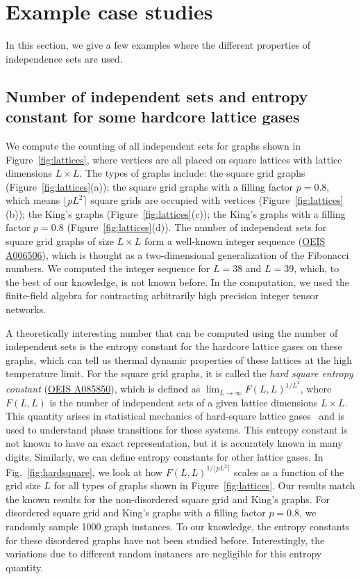 \documentclass[onefignum, onetabnum]{siamart190516}
\newcommand{\<}{\langle}
\renewcommand{\>}{\rangle}
\newcommand{\Fig}[1]{Fig.~\ref{#1}}
\newcounter{example}
\begin{document}
\section{Example case studies} \label{sec:examples}
In this section, we give a few examples where the different properties of independence sets are used.

\subsection{Number of independent sets and entropy constant for some hardcore lattice gases}\label{sec:entropy}
We compute the counting of all independent sets for graphs shown in Figure~\ref{fig:lattices}, where vertices are all placed on square lattices with lattice dimensions $L \times L$.
The types of graphs include: the square grid graphs (Figure~\ref{fig:lattices}(a)); the square grid graphs with a filling factor $p=0.8$, which means $\lfloor pL^{2} \rceil$ square grids are occupied with vertices  (Figure~\ref{fig:lattices}(b));
the King's graphs  (Figure~\ref{fig:lattices}(c)); the King's graphs with a filling factor $p = 0.8$  (Figure~\ref{fig:lattices}(d)).
The number of independent sets for square grid graphs of size $L \times L$ form a well-known integer sequence (\href{https://oeis.org/A006506}{OEIS A006506}), which is thought as a two-dimensional generalization of the Fibonacci numbers.
We computed the integer sequence for $L=38$ and $L=39$, which, to the best of our knowledge, is not known before.
In the computation, we used the finite-field algebra for contracting arbitrarily high precision integer tensor networks. 

A theoretically interesting number that can be computed using the number of independent sets is the entropy constant for the hardcore lattice gases on these graphs, which can tell us thermal dynamic properties of these lattices at the high temperature limit.
For the square grid graphs, it is called the \textit{hard square entropy constant} (\href{https://oeis.org/A085850}{OEIS A085850}), which is defined as $\lim_{L\rightarrow \infty} F(L,L)^{1/L^2}$, where $F(L,L)$ is the number of independent sets of a given lattice dimensions $L \times L$. This quantity arises in statistical mechanics of hard-square lattice gases~\cite{Baxter1980, Pearce1988} and is used to understand phase transitions for these systems. This entropy constant is not known to have an exact representation, but it is accurately known in many digits. Similarly, we can define entropy constants for other lattice gases. In \Fig{fig:hardsquare}, we look at how $F(L,L)^{1/\lfloor pL^2\rceil}$ scales as a function of the grid size $L$ for all types of graphs shown in Figure~\ref{fig:lattices}. Our results match the known results for the non-disordered square grid and King's graphs. For disordered square grid and King's graphs with a filling factor $p=0.8$, we randomly sample 1000 graph instances. To our knowledge, the entropy constants for these disordered graphs have not been studied before. Interestingly, the variations due to different random instances are negligible for this entropy quantity. 
\end{document}
